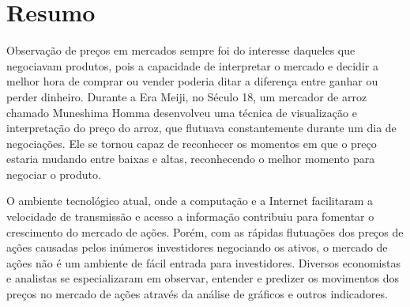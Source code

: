 \documentclass[12pt]{article}
\begin{document}
 



{}
\section*{Resumo}


Observação de preços em mercados sempre foi do interesse daqueles que negociavam produtos,
pois a capacidade de interpretar o mercado e decidir a melhor hora de comprar ou vender
poderia ditar a diferença entre ganhar ou perder dinheiro. Durante a Era Meiji, no Século 18,
um mercador de arroz chamado Muneshima Homma desenvolveu uma técnica de visualização e
interpretação do preço do arroz, que flutuava constantemente durante um dia de negociações.
Ele se tornou capaz de reconhecer os momentos em que o preço estaria mudando entre baixas e
altas, reconhecendo o melhor momento para negociar o produto.


O ambiente tecnológico atual, onde a computação e a Internet facilitaram a velocidade de
transmissão e acesso a informação contribuiu para fomentar o crescimento do mercado de ações.
Porém, com as rápidas flutuações dos preços de ações causadas pelos inúmeros investidores
negociando os ativos, o mercado de ações não é um ambiente de fácil entrada para investidores.
Diversos economistas e analistas se especializaram em observar, entender e predizer os
movimentos dos preços no mercado de ações através da análise de gráficos e outros indicadores.
\end{document}
